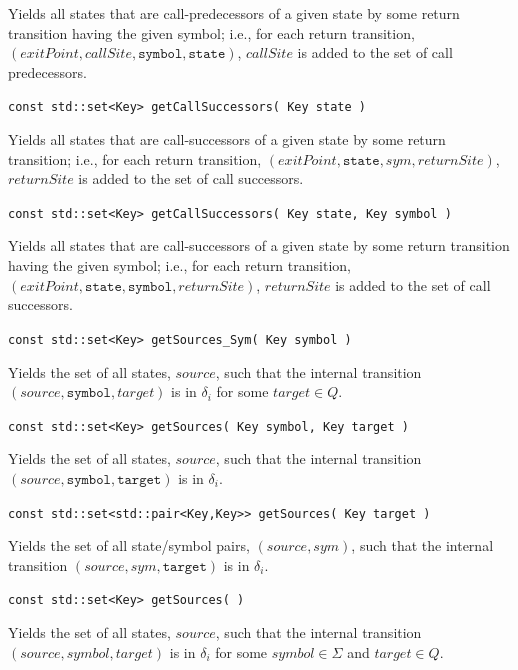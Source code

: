 \documentclass{llncs}
\begin{document}
\begin{description}
    Yields all states that are call-predecessors of a given state by some return transition having the given symbol; i.e., for each return transition, $(exitPoint,callSite,\texttt{symbol},\texttt{state})$, $callSite$ is added to the set of call predecessors.

  \item\texttt{const std::set<Key> getCallSuccessors( Key state )} \nopagebreak

    Yields all states that are call-successors of a given state by some return transition; i.e., for each return transition, $(exitPoint,\texttt{state},sym,returnSite)$, $returnSite$ is added to the set of call successors.

  \item\texttt{const std::set<Key> getCallSuccessors( Key state, Key symbol )} \nopagebreak

    Yields all states that are call-successors of a given state by some return transition having the given symbol; i.e., for each return transition, $(exitPoint,\texttt{state},\texttt{symbol},returnSite)$, $returnSite$ is added to the set of call successors.

  \item\texttt{const std::set<Key> getSources\_Sym( Key symbol )} \nopagebreak

    Yields the set of all states, $source$, such that the internal transition $(source,\texttt{symbol},target)$ is in $\delta_i$ for some $target \in Q$.

  \item\texttt{const std::set<Key> getSources( Key symbol, Key target )} \nopagebreak

    Yields the set of all states, $source$, such that the internal transition $(source,\texttt{symbol},\texttt{target})$ is in $\delta_i$.

  \item\texttt{const std::set<std::pair<Key,Key>> getSources( Key target )} \nopagebreak

    Yields the set of all state/symbol pairs, $(source,sym)$, such that the internal transition $(source,sym,\texttt{target})$ is in $\delta_i$.

  \item\texttt{const std::set<Key> getSources( )} \nopagebreak

    Yields the set of all states, $source$, such that the internal transition $(source,symbol,target)$ is in $\delta_i$ for some $symbol \in \Sigma$ and $target \in Q$.


\end{description}
\end{document}
